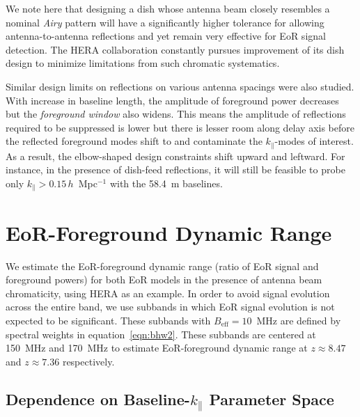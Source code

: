 \documentclass[preprint2,iop,numberedappendix,twocolappendix,appendixfloats]{emulateapj}
\begin{document}
We note here that designing a dish whose antenna beam closely resembles a nominal {\it Airy} pattern will have a significantly higher tolerance for allowing antenna-to-antenna reflections and yet remain very effective for EoR signal detection. The HERA collaboration constantly pursues improvement of its dish design to minimize limitations from such chromatic systematics.

Similar design limits on reflections on various antenna spacings were also studied. With increase in baseline length, the amplitude of foreground power decreases but the {\it foreground window} also widens. This means the amplitude of reflections required to be suppressed is lower but there is lesser room along delay axis before the reflected foreground modes shift to and contaminate the $k_\parallel$-modes of interest. As a result, the elbow-shaped design constraints shift upward and leftward. For instance, in the presence of dish-feed reflections, it will still be feasible to probe only $k_\parallel > 0.15\,h$~Mpc$^{-1}$ with the 58.4~m baselines.

\section{EoR-Foreground Dynamic Range}\label{sec:eor-sensitivity}

We estimate the EoR-foreground dynamic range (ratio of EoR signal and foreground powers) for both EoR models in the presence of antenna beam chromaticity, using HERA as an example. %
In order to avoid signal evolution across the entire band, we use subbands in which EoR signal evolution is not expected to be significant. These subbands with $B_\textrm{eff}=10$~MHz are defined by spectral weights in equation~\ref{eqn:bhw2}. These subbands are centered at 150~MHz and 170~MHz to estimate EoR-foreground dynamic range at $z \approx 8.47$ and $z \approx 7.36$ respectively.

\subsection{Dependence on Baseline-$k_\parallel$ Parameter Space}\label{sec:baseline-kprll}
\end{document}
